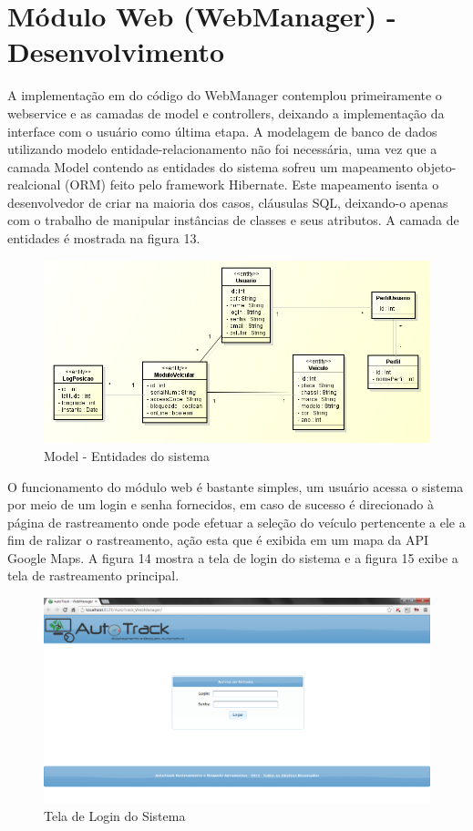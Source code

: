 \section{Módulo Web (WebManager) - Desenvolvimento}
A implementação em do código do WebManager contemplou primeiramente o webservice e as camadas de model e controllers, deixando a implementação da interface com o usuário como última etapa. A modelagem de banco de dados utilizando modelo entidade-relacionamento não foi necessária, uma vez que a camada Model contendo as entidades do sistema sofreu um mapeamento objeto-realcional (ORM) feito pelo framework Hibernate. Este mapeamento isenta o desenvolvedor de criar na maioria dos casos, cláusulas SQL, deixando-o apenas com o trabalho de manipular instâncias de classes e seus atributos. A camada de entidades é mostrada na figura 13.

\begin{figure}[!htb]
	\centering
	\includegraphics[width=15.00cm\textwidth]{figures/model.png}
	\caption{Model - Entidades do sistema}
	\label{Figura 13}
\end{figure}

O funcionamento do módulo web é bastante simples, um usuário acessa o sistema por meio de um login e senha fornecidos, em caso de sucesso é direcionado à página de rastreamento onde pode efetuar a seleção do veículo pertencente a ele a fim de ralizar o rastreamento, ação esta que é exibida em um mapa da API Google Maps. A figura 14 mostra a tela de login do sistema e a figura 15 exibe a tela de rastreamento principal.

\begin{figure}[!htb]
	\centering
	\includegraphics[width=15.00cm\textwidth]{figures/webmanager_login.png}
	\caption{Tela de Login do Sistema}
	\label{Figura 14}
\end{figure}

